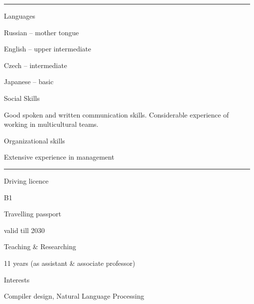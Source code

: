 \documentclass[a4paper,10pt]{article}
\newlength{\cvcolumngapwidth}
\newlength{\cvleftcolumnwidth}
\newlength{\cvrightcolumnwidth}
\newcommand{\cvsectionstyle}[1]{{\normalsize\cvsectionfont\textcolor{cvsectioncolor}{#1}}}
\newcommand{\cvheadingstyle}[1]{{\normalsize\cvheadingfont\textcolor{cvheadingcolor}{#1}}}
\newlength{\cvafteritemskipamount}
\newlength{\cvaftersectionskipamount}
\newlength{\cvbetweensectionandheadingextraskipamount}
\newlength{\cvparskip}
\newcommand{\cvsection}[1]{
    \begin{minipage}[t]{\cvleftcolumnwidth}
        \raggedleft\cvsectionstyle{#1}
    \end{minipage}%
    \hspace{\cvcolumngapwidth}%
    \begin{minipage}[t]{\cvrightcolumnwidth}
        \textcolor{cvrulecolor}{\rule{\cvrightcolumnwidth}{0.3mm}}
    \end{minipage}

    \vspace{\cvaftersectionskipamount}
}
\newcommand{\cvitem}[2]{
    \begin{minipage}[t]{\cvleftcolumnwidth}
        \raggedleft #1
    \end{minipage}%
    \hspace{\cvcolumngapwidth}%
    \begin{minipage}[t]{\cvrightcolumnwidth}
        \setlength{\parskip}{\cvparskip} #2
    \end{minipage}

    \vspace{\cvafteritemskipamount}
}
\begin{document}

\cvsection{SKILLS}

\vspace{\cvbetweensectionandheadingextraskipamount}

\cvitem{
    \cvheadingstyle{Languages}
}{
    Russian -- mother tongue

    English -- upper intermediate

    Czech -- intermediate

    Japanese -- basic
}

\cvitem{
    \cvheadingstyle{Social Skills}
}{
    Good spoken and written communication skills. Considerable experience of working in multicultural teams.
}
\cvitem{
    \cvheadingstyle{Organizational skills}
}{
    Extensive experience in management
}


\cvsection{ADDITIONAL INFORMATION}

\vspace{\cvbetweensectionandheadingextraskipamount}

\cvitem{
    \cvheadingstyle{Driving licence}
}{
    B1
}
\cvitem{
    \cvheadingstyle{Travelling passport}
}{
    valid till 2030
}
\cvitem{
    \cvheadingstyle{Teaching \& Researching}
}{
    11 years (as assistant \& associate professor)
}

\cvitem{
    \cvheadingstyle{Interests}
}{
    Compiler design, Natural Language Processing
}
\end{document}
